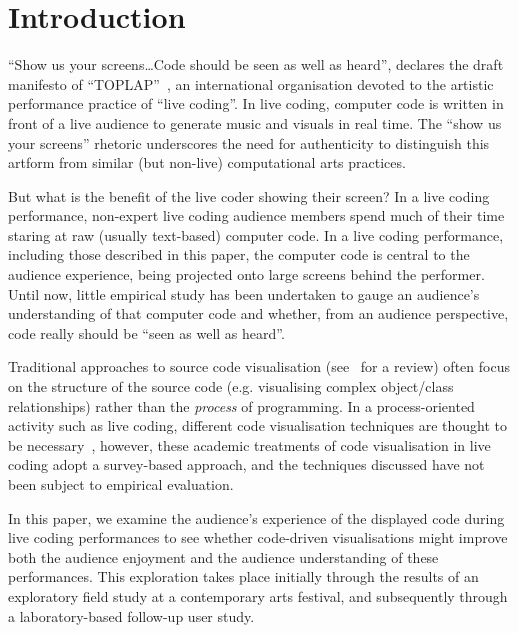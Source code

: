 \documentclass{sig-alternate}
\begin{document}


\section{Introduction}

``Show us your screens\ldots Code should be seen as well as heard'',
declares the draft manifesto of ``TOPLAP''~\cite{Toplap}, an
international organisation devoted to the artistic performance
practice of ``live coding''. In live coding, computer code is written
in front of a live audience to generate music and visuals in real
time. The ``show us your screens'' rhetoric underscores the need for
authenticity to distinguish this artform from similar (but non-live)
computational arts practices.

But what is the benefit of the live coder showing their screen? In a
live coding performance, non-expert live coding audience members spend
much of their time staring at raw (usually text-based) computer code.
In a live coding performance, including those described in this paper,
the computer code is central to the audience experience, being
projected onto large screens behind the performer. Until now, little
empirical study has been undertaken to gauge an audience's
understanding of that computer code and whether, from an audience
perspective, code really should be ``seen as well as heard''.

Traditional approaches to source code visualisation
(see~\cite{Novais2013} for a review) often focus on the structure of
the source code (e.g. visualising complex object/class relationships)
rather than the \emph{process} of programming. In a process-oriented
activity such as live coding, different code visualisation techniques
are thought to be necessary~\cite{McLean2010b,Magnusson2013}, however,
these academic treatments of code visualisation in live coding adopt a
survey-based approach, and the techniques discussed have not been
subject to empirical evaluation.

In this paper, we examine the audience's experience of the displayed
code during live coding performances to see whether code-driven
visualisations might improve both the audience enjoyment and the
audience understanding of these performances. This exploration takes
place initially through the results of an exploratory field study at a
contemporary arts festival, and subsequently through a
laboratory-based follow-up user study.
\end{document}
